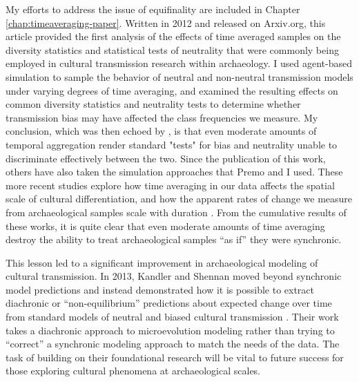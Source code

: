 My efforts to address the issue of equifinality are included in Chapter \ref{chap:timeaveraging-paper}. Written in 2012 and released on Arxiv.org, this article provided the first analysis of the effects of time averaged samples on the diversity statistics and statistical tests of neutrality that were commonly being employed in cultural transmission research within archaeology. I used agent-based simulation to sample the behavior of neutral and non-neutral transmission models under varying degrees of time averaging, and examined the resulting effects on common diversity statistics and neutrality tests to determine whether transmission bias may have affected the class frequencies we measure. My conclusion, which was then echoed by \citet{Premo2014}, is that even moderate amounts of temporal aggregation render standard "tests" for bias and neutrality unable to discriminate effectively between the two. Since the publication of this work, others have also taken the simulation approaches that Premo and I used. These more recent studies explore how time averaging in our data affects the spatial scale of cultural differentiation, and how the apparent rates of change we measure from archaeological samples scale with duration \citep{miller2018time,Porvcic2014,perreault2018time}. From the cumulative results of these works, it is quite clear that even moderate amounts of time averaging destroy the ability to treat archaeological samples ``as if'' they were synchronic.

This lesson led to a significant improvement in archaeological modeling of cultural transmission. In 2013, Kandler and Shennan \citeyearpar{Kandler2013} moved beyond synchronic model predictions and  instead demonstrated how it is possible to extract diachronic or “non-equilibrium” predictions about expected change over time from standard models of neutral and biased cultural transmission . Their work takes a diachronic approach to microevolution modeling rather than trying to “correct” a synchronic modeling approach to match the needs of the data.  The task of building on their foundational research will be vital to future success for those exploring cultural phenomena at archaeological scales.

